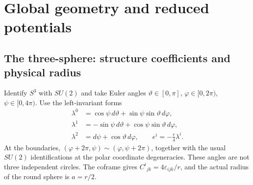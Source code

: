 \section{Global geometry and reduced potentials}\label{sec3}
\subsection{The three-sphere: structure coefficients and physical radius}
Identify $S^3$ with $SU(2)$ and take Euler angles
$\vartheta\in[0,\pi]$, $\varphi\in[0,2\pi)$, $\psi\in[0,4\pi)$.
Use the left-invariant forms
\begin{equation}
\begin{aligned}
\lambda^0&=\cos\psi\,d\vartheta+\sin\psi\sin\vartheta\,d\varphi,\\
\lambda^1&=-\sin\psi\,d\vartheta+\cos\psi\sin\vartheta\,d\varphi,\\
\lambda^2&=d\psi+\cos\vartheta\,d\varphi,\qquad
e^i=-\frac r4\lambda^i.
\end{aligned}
\tag{M3-01}\label{eq:M3-01}
\end{equation}
At the boundaries, $(\varphi+2\pi,\psi)\sim(\varphi,\psi+2\pi)$,
together with the usual $SU(2)$ identifications at the polar coordinate
degeneracies. These angles are not three independent circles.
The coframe gives $C^i{}_{jk}=4\varepsilon_{ijk}/r$,
and the actual radius of the round sphere is $a=r/2$.

